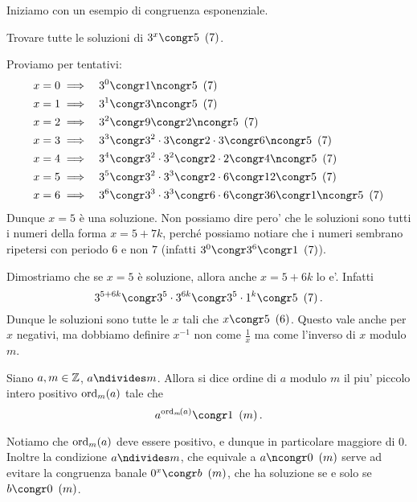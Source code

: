 Iniziamo con un esempio di congruenza esponenziale.
\begin{example}
    Trovare tutte le soluzioni di $3^x \congr 5 \Mod{7}$.
\end{example}
\begin{solution}
    Proviamo per tentativi:
    \begin{alignat*}
        {2}
        &x = 0 \implies &&3^0 \congr 1 \ncongr 5 \Mod{7}\\
        &x = 1 \implies &&3^1 \congr 3 \ncongr 5 \Mod{7}\\
        &x = 2 \implies &&3^2 \congr 9 \congr 2 \ncongr 5 \Mod{7}\\
        &x = 3 \implies &&3^3 \congr 3^2 \cdot 3 \congr 2 \cdot 3 \congr 6 \ncongr 5 \Mod{7}\\
        &x = 4 \implies &&3^4 \congr 3^2 \cdot 3^2 \congr 2 \cdot 2 \congr 4 \ncongr 5 \Mod{7}\\
        &x = 5 \implies &&3^5 \congr 3^2 \cdot 3^3 \congr 2 \cdot 6 \congr 12 \congr 5 \Mod{7}\\
        &x = 6 \implies &&3^6 \congr 3^3 \cdot 3^3 \congr 6 \cdot 6 \congr 36 \congr 1 \ncongr 5 \Mod{7}
    \end{alignat*}
    Dunque $x = 5$ è una soluzione. Non possiamo dire pero' che le soluzioni sono tutti i numeri della forma $x = 5 + 7k$, perché possiamo notiare che i numeri sembrano ripetersi con periodo $6$ e non $7$ (infatti $3^0 \congr 3^6 \congr 1 \Mod{7}$). 

    Dimostriamo che se $x = 5$ è soluzione, allora anche $x = 5 +6k$ lo e'. Infatti \[
        3^{5 + 6k} \congr 3^5 \cdot 3^{6k} \congr 3^5 \cdot 1^k \congr 5 \Mod{7}.
    \]
    Dunque le soluzioni sono tutte le $x$ tali che $x \congr 5 \Mod{6}$. Questo vale anche per $x$ negativi, ma dobbiamo definire $x^{-1}$ non come $\frac{1}{x}$ ma come l'inverso di $x$ modulo $m$.
\end{solution}

\begin{definition}
    Siano $a, m \in \Z$, $a \ndivides m$. Allora si dice ordine di $a$ modulo $m$ il piu' piccolo intero positivo $\ord{a}{m}$ tale che \begin{equation}
        a^{\ord{a}{m}} \congr 1 \Mod{m}.
    \end{equation}
\end{definition}

\begin{remark}
    Notiamo che $\ord{a}{m}$ deve essere positivo, e dunque in particolare maggiore di $0$. Inoltre la condizione $a \ndivides m$, che equivale a $a \ncongr 0 \Mod{m}$ serve ad evitare la congruenza banale $0^x \congr b \Mod{m}$, che ha soluzione se e solo se $b \congr 0 \Mod{m}$.
\end{remark}


